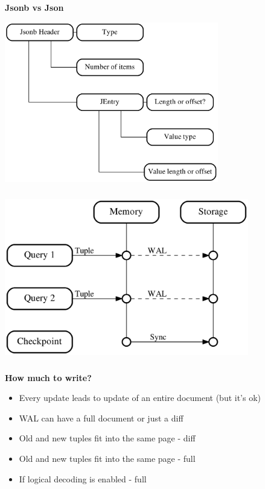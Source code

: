 \documentclass[usenames,dvipsnames, 18pt, compress, aspectratio=169]{beamer}
\begin{document}
\begin{frame}
    \frametitle{}
    \begin{center}
        \textbf{Jsonb vs Json}

        \includegraphics[width=0.7\textwidth,center]{jsonb_header.png}

    \end{center}
\end{frame}

\begin{frame}
    \frametitle{}
    \begin{center}

        \includegraphics[width=0.8\textwidth,center]{wal.png}

    \end{center}
\end{frame}

\begin{frame}
    \frametitle{}
    \begin{center}
    \textbf{How much to write?}

        \begin{itemize}[label={\MVRightarrow}]
            \item Every update leads to update of an entire document (but it's ok)
            \item WAL can have a full document or just a diff
            \item Old and new tuples fit into the same page - diff
            \item Old and new tuples fit into the same page - full
            \item If logical decoding is enabled - full
        \end{itemize}

    \end{center}
\end{frame}
\end{document}
